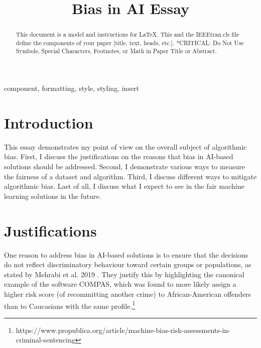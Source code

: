 \documentclass[conference]{IEEEtran}
\begin{document}
\title{Bias in AI Essay
}

\author{
}

\maketitle

\begin{abstract}
This document is a model and instructions for \LaTeX.
This and the IEEEtran.cls file define the components of your paper [title, text, heads, etc.]. *CRITICAL: Do Not Use Symbols, Special Characters, Footnotes, 
or Math in Paper Title or Abstract.
\end{abstract}

\begin{IEEEkeywords}
component, formatting, style, styling, insert
\end{IEEEkeywords}

\section{Introduction}
This essay demonstrates my point of view on the overall subject of algorithmic bias. First, I discuss the justifications on the reasons that bias in AI-based solutions should be addressed. Second, I demonstrate various ways to measure the fairness of a dataset and algorithm. Third, I discuss different ways to mitigate algorithmic bias. Last of all, I discuss what I expect to see in the fair machine learning solutions in the future.

\section{Justifications}
One reason to address bias in AI-based solutions is to ensure that the decisions do not reflect discriminatory behaviour toward certain groups or populations, as stated by Mehrabi et al. 2019 \cite{DBLP:journals/corr/abs-1908-09635}. They justify this by highlighting the canonical example of the software COMPAS, which was found to more likely assign a higher risk score (of recommitting another crime) to African-American offenders than to Caucasians with the same profile.\footnote{https://www.propublica.org/article/machine-bias-risk-assessments-in-criminal-sentencing} 
\end{document}
